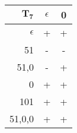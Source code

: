 \begingroup
\scriptsize
\begin{tabular}{r | c c}
    $\mathbf{T_7}$ & $\epsilon$ & 0\\ \hline
    $\epsilon$ & + & + \\
    51 & - & - \\
    51,0 & - & + \\ \hline
    0 & + & + \\
    101 & + & + \\
    51,0,0 & + & +
\end{tabular}
\endgroup

